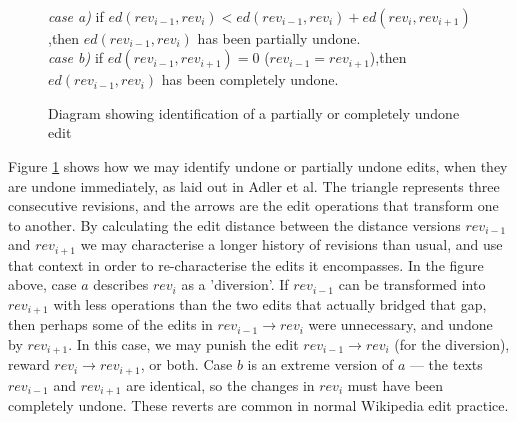 \begin{figure}[h]
  \centering
  \\ 
  \vspace{5mm}
  \textit{case a)} if $ed(rev_{i-1},rev_i) < ed(rev_{i-1},rev_i) +
  ed(rev_{i},rev_{i+1})$,\newline then $ed(rev_{i-1},rev_i)$ has been
  partially undone.\\
  \vspace{5mm}
  \textit{case b)} if $ed(rev_{i-1},rev_{i+1}) = 0$
  ($rev_{i-1} = rev_{i+1}$),\newline then $ed(rev_{i-1},rev_i)$ has been
  completely undone.
  \caption{Diagram showing identification of a partially or
    completely undone edit}
  \label{fig:undo}
\end{figure}

Figure \ref{fig:undo} shows how we may identify undone or partially
undone edits, when they are undone immediately, as laid out in Adler
et al.\cite{Adler2007} The triangle represents three consecutive
revisions, and the arrows are the edit operations that transform one
to another. By calculating the edit distance between the distance
versions $rev_{i-1}$ and $rev_{i+1}$ we may characterise a longer history
of revisions than usual, and use that context in order to
re-characterise the edits it encompasses. In the figure above, case
$a$ describes $rev_i$ as a 'diversion'. If $rev_{i-1}$ can be transformed
into $rev_{i+1}$ with less operations than the two edits that actually
bridged that gap, then perhaps some of the edits in $rev_{i-1}
\rightarrow rev_i$ were unnecessary, and undone by $rev_{i+1}$. In this
case, we may punish the edit $rev_{i-1} \rightarrow rev_i$ (for the
diversion), reward $rev_{i} \rightarrow rev_{i+1}$, or both. Case $b$ is
an extreme version of $a$ --- the texts $rev_{i-1}$ and $rev_{i+1}$ are
identical, so the changes in $rev_i$ must have been completely
undone. These reverts are common in normal Wikipedia edit
practice.\cite{wiki-revert}

